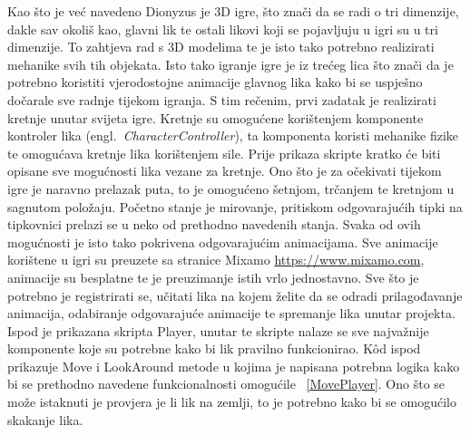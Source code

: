 Kao što je već navedeno Dionyzus je 3D igre, što znači da se radi o tri dimenzije, dakle sav okoliš kao, glavni lik te ostali likovi koji se pojavljuju u igri su u tri dimenzije. To zahtjeva rad s 3D modelima te je isto tako potrebno realizirati mehanike svih tih objekata. Isto tako igranje igre je iz trećeg lica što znači da je potrebno koristiti vjerodostojne animacije glavnog lika kako bi se uspješno dočarale sve radnje tijekom igranja. 
S tim rečenim, prvi zadatak je realizirati kretnje unutar svijeta igre. Kretnje su omogućene korištenjem komponente kontroler lika (engl.~\textit{CharacterController}), ta komponenta koristi mehanike fizike te omogućava kretnje lika korištenjem sile. Prije prikaza skripte kratko će biti opisane sve mogućnosti lika vezane za kretnje. Ono što je za očekivati tijekom igre je naravno prelazak puta, to je omogućeno šetnjom, trčanjem te kretnjom u sagnutom položaju. Početno stanje je mirovanje, pritiskom odgovarajućih tipki na tipkovnici prelazi se u neko od prethodno navedenih stanja. Svaka od ovih mogućnosti je isto tako pokrivena odgovarajućim animacijama. Sve animacije korištene u igri su preuzete sa stranice Mixamo  \url{https://www.mixamo.com}, animacije su besplatne te je preuzimanje istih vrlo jednostavno. Sve što je potrebno je registrirati se, učitati lika na kojem želite da se odradi prilagođavanje animacija, odabiranje odgovarajuće animacije te spremanje lika unutar projekta. Ispod je prikazana skripta Player, unutar te skripte nalaze se sve najvažnije komponente koje su potrebne kako bi lik pravilno funkcionirao. K\^od ispod prikazuje Move  i LookAround metode u kojima je napisana potrebna logika kako bi se prethodno navedene funkcionalnosti omogućile ~\ref{MovePlayer}. Ono što se može istaknuti je provjera je li lik na zemlji, to je potrebno kako bi se omogućilo skakanje lika.
